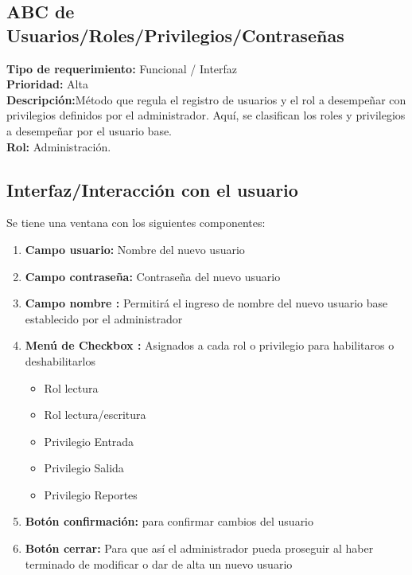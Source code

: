 \documentclass[a4paper,DIV=12]{scrreprt}
\begin{document}
\setcounter{section}{3}
\setcounter{subsection}{-1}
\subsection{ABC de Usuarios/Roles/Privilegios/Contraseñas}
\noindent
\textbf{Tipo de requerimiento:} Funcional / Interfaz\\
\textbf{Prioridad:} Alta\\
\textbf{Descripción:}Método que regula el registro de usuarios y el rol a desempeñar con privilegios definidos por el administrador. Aquí, se clasifican los roles y privilegios a desempeñar por el usuario base.\\
\textbf{Rol:} Administración.
\subsection*{Interfaz/Interacción con el usuario}

Se tiene una ventana con los siguientes componentes: 

\begin{enumerate}
	\item{\textbf{Campo usuario: }
	Nombre del nuevo usuario 
}
	\item{\textbf{Campo contraseña: }Contraseña del nuevo usuario}
	\item{\textbf{Campo nombre : }Permitirá el ingreso de nombre del nuevo usuario base establecido por el administrador }
	
	\item{\textbf{Menú de Checkbox : }Asignados a cada rol o privilegio para habilitaros o deshabilitarlos }
	\begin{itemize}
		\item{Rol lectura }	
		\item{Rol lectura/escritura}	
		\item{Privilegio Entrada}		
		\item{Privilegio Salida}	
		\item{Privilegio Reportes}					
	\end{itemize}

	\item{\textbf{Botón confirmación: }para confirmar cambios del usuario}
	\item{\textbf{Botón cerrar: }Para que así el administrador pueda proseguir al haber terminado de modificar o dar de alta un nuevo usuario}		
\end{enumerate}
\end{document}
